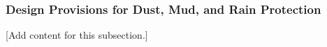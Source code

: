
\subsubsection{Design Provisions for Dust, Mud, and Rain Protection}
\label{subsubsec:design_2_7_2_dust_mud_rain_protection}

[Add content for this subsection.]

